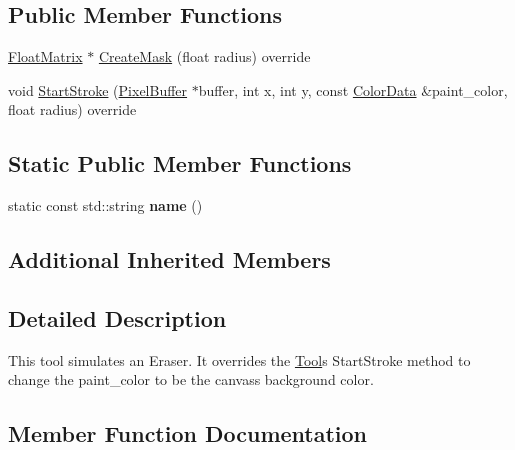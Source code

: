 \subsection*{Public Member Functions}
\begin{DoxyCompactItemize}
\item 
\hyperlink{classimage__tools_1_1FloatMatrix}{Float\+Matrix} $\ast$ \hyperlink{classimage__tools_1_1ToolEraser_a5720244391587679acb8645a3fbd3d63}{Create\+Mask} (float radius) override
\item 
void \hyperlink{classimage__tools_1_1ToolEraser_a5b00cd104c6fb0b34fa3f1f5165ab189}{Start\+Stroke} (\hyperlink{classimage__tools_1_1PixelBuffer}{Pixel\+Buffer} $\ast$buffer, int x, int y, const \hyperlink{classimage__tools_1_1ColorData}{Color\+Data} \&paint\+\_\+color, float radius) override
\end{DoxyCompactItemize}
\subsection*{Static Public Member Functions}
\begin{DoxyCompactItemize}
\item 
\mbox{\label{classimage__tools_1_1ToolEraser_a95d93a6bb8ab437f44f4846c6d08c74f}} 
static const std\+::string {\bfseries name} ()
\end{DoxyCompactItemize}
\subsection*{Additional Inherited Members}


\subsection{Detailed Description}
This tool simulates an Eraser. It overrides the \hyperlink{classimage__tools_1_1Tool}{Tool}\textquotesingle{}s Start\+Stroke method to change the paint\+\_\+color to be the canvas\textquotesingle{}s background color. 

\subsection{Member Function Documentation}
\mbox{\label{classimage__tools_1_1ToolEraser_a5720244391587679acb8645a3fbd3d63}} 
